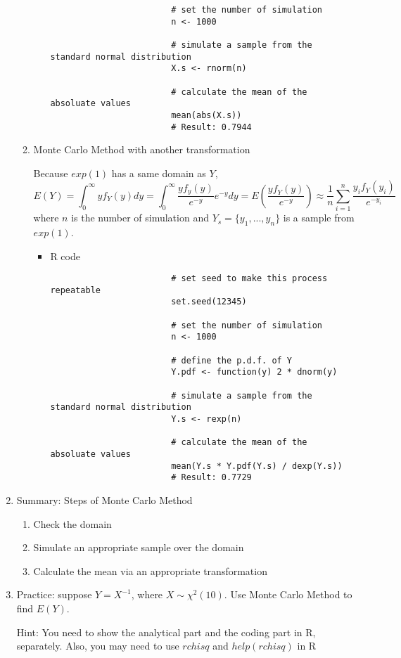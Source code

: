 \begin{enumerate}
\begin{enumerate}
\begin{itemize}
\begin{verbatim}
						# set the number of simulation
						n <- 1000
						
						# simulate a sample from the standard normal distribution
						X.s <- rnorm(n)
						
						# calculate the mean of the absoluate values
						mean(abs(X.s))
						# Result: 0.7944
					\end{verbatim}
				\end{itemize}
			\item Monte Carlo Method with another transformation
				\par Because $exp(1)$ has a same domain as $Y$, 
				\begin{equation*}
					E(Y) = \int_{0}^{\infty}yf_Y(y)dy = \int_{0}^{\infty}\frac{yf_y(y)}{e^{-y}}e^{-y}dy = E(\frac{yf_Y(y)}{e^{-y}}) \approx \frac{1}{n}\sum_{i=1}^{n}\frac{y_if_Y(y_i)}{e^{-y_i}}
				\end{equation*}
				where $n$ is the number of simulation and $Y_s = \{y_1, ..., y_n\}$ is a sample from $exp(1)$.
				\begin{itemize}
					\item R code
					\begin{verbatim}
						# set seed to make this process repeatable
						set.seed(12345)
						
						# set the number of simulation
						n <- 1000
						
						# define the p.d.f. of Y
						Y.pdf <- function(y) 2 * dnorm(y)
						
						# simulate a sample from the standard normal distribution
						Y.s <- rexp(n)
						
						# calculate the mean of the absoluate values
						mean(Y.s * Y.pdf(Y.s) / dexp(Y.s))
						# Result: 0.7729
					\end{verbatim}
				\end{itemize}
		\end{enumerate}
	\item Summary: Steps of Monte Carlo Method
		\begin{enumerate}
			\item Check the domain
			\item Simulate an appropriate sample over the domain 
			\item Calculate the mean via an appropriate transformation
		\end{enumerate}
	\item Practice: suppose $Y = X^{-1}$, where $X \sim \chi^2(10)$. Use Monte Carlo Method to find $E(Y)$.
	\par Hint: You need to show the analytical part and the coding part in R, separately. Also, you may need to use $rchisq$ and $help(rchisq)$ in R
\end{enumerate}